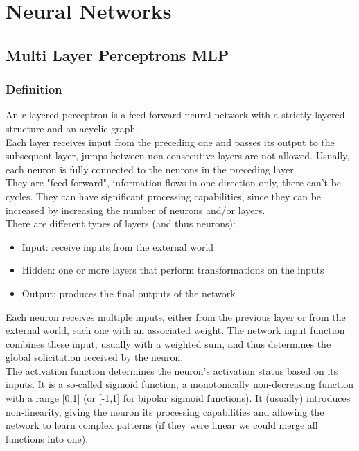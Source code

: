 \section{Neural Networks}

\subsection{Multi Layer Perceptrons MLP}

\subsubsection{Definition}
An $r$-layered perceptron is a feed-forward neural network with a strictly layered structure and an acyclic graph.\\

Each layer receives input from the preceding one and passes its output to the subsequent layer, jumps between non-consecutive layers are not allowed. Usually, each neuron is fully connected to the neurons in the preceding layer. \\

They are "feed-forward", information flows in one direction only, there can't be cycles. They can have significant processing capabilities, since they can be increased by increasing the number of neurons and/or layers.\\

There are different types of layers (and thus neurons):
\begin{itemize}
	\item Input: receive inputs from the external world
	\item Hidden: one or more layers that perform transformations on the inputs
	\item Output: produces the final outputs of the network
\end{itemize}

Each neuron receives multiple inputs, either from the previous layer or from the external world, each one with an associated weight. The network input function combines these input, usually with a weighted sum, and thus determines the global solicitation received by the neuron.\\

The activation function determines the neuron's activation status based on its inputs. It is a so-called sigmoid function, a monotonically non-decreasing function with a range [0,1] (or [-1,1] for bipolar sigmoid functions). It (usually) introduces non-linearity, giving the neuron its processing capabilities and allowing the network to learn complex patterns (if they were linear we could merge all functions into one).\\


